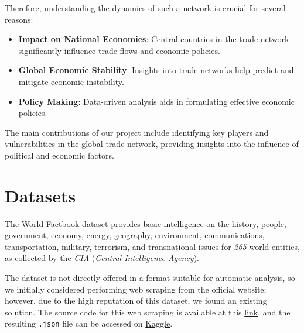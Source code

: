 \documentclass[12pt, a4paper]{article}
\begin{document}
Therefore, understanding the dynamics of such a network is crucial for several reasons:
\begin{itemize}
    \item \textbf{Impact on National Economies}: Central countries in the trade network significantly influence trade flows and economic policies.
    \item \textbf{Global Economic Stability}: Insights into trade networks help predict and mitigate economic instability.
    \item \textbf{Policy Making}: Data-driven analysis aids in formulating effective economic policies.
\end{itemize}

The main contributions of our project include identifying key players and vulnerabilities in the global trade network, providing insights into the influence of political and economic factors.

\section{Datasets}
\label{datasets}

The \href{https://www.cia.gov/the-world-factbook/}{World Factbook} dataset provides basic intelligence on the history, people, government, economy, energy, geography, environment, communications, transportation, military, terrorism, and transnational issues for \textit{265} world entities, as collected by the \textit{CIA} (\textit{Central Intelligence Agency}).

The dataset is not directly offered in a format suitable for automatic analysis, so we initially considered performing web scraping from the official website; however, due to the high reputation of this dataset, we found an existing solution. The source code for this web scraping is available at this \href{https://github.com/lucafrance/cia-factbook-scraper}{link}, and the resulting \texttt{.json} file can be accessed on \href{https://www.kaggle.com/datasets/lucafrance/the-world-factbook-by-cia}{Kaggle}.
\end{document}
